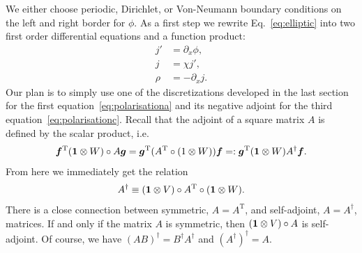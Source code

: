 We either choose periodic, Dirichlet, or Von-Neumann boundary conditions on the 
left and right border for $\phi$. 
As a first step we rewrite Eq.~\eqref{eq:elliptic} into two first order differential equations and a function product:
\begin{subequations}
\begin{align}
    j'&= \partial_x \phi, \label{eq:polarisationa}\\
    j &= \chi j', \label{eq:polarisationb}\\
    \rho &= -\partial_x j. \label{eq:polarisationc}
\end{align}
\end{subequations}
Our plan is to simply use one of the discretizations developed in the last
section for the first equation~\eqref{eq:polarisationa}
and its negative adjoint for the third equation~\eqref{eq:polarisationc}.
Recall that the adjoint of a square matrix $A$ is defined by the scalar product, i.e.
\begin{align}
    {\boldsymbol{f}}^\mathrm{T} (\mathbf{1}\otimes W)\circ A{\boldsymbol{g}} = 
    {\boldsymbol{g}}^\mathrm{T} (A^\mathrm{T}\circ(1\otimes W)) {\boldsymbol{f}} =:     {\boldsymbol{g}}^\mathrm{T} (\mathbf{1}\otimes W) A^\dagger {\boldsymbol{f}}. \nonumber
    \label{}
\end{align}
From here we immediately get the relation
\begin{align}
    A^\dagger \equiv (\mathbf{1}\otimes V)\circ A^\mathrm{T}\circ (\mathbf{1}\otimes W).
    \label{eq:adjoint}
\end{align}
There is a close connection between symmetric, $A=A^\mathrm{T}$, and self-adjoint, $A=A^\dagger$, matrices.
If and only if the matrix $A$ is symmetric, then $(\mathbf{1}\otimes V)\circ A$ is self-adjoint. Of course, we have $(AB)^\dagger = B^\dagger A^\dagger$ and $(A^\dagger)^\dagger = A$.


